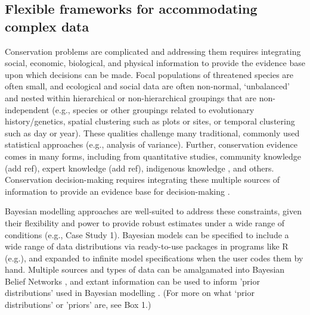 \documentclass{article}
\begin{document}
\subsection*{Flexible frameworks for accommodating complex data}
\par Conservation problems are complicated and addressing them requires integrating social, economic, biological, and physical information to provide the evidence base upon which decisions can be made. Focal populations of threatened species are often small, and ecological and social data are often non-normal, `unbalanced' and nested within hierarchical or non-hierarchical groupings that are non-independent (e.g., species or other groupings related to evolutionary history/genetics, spatial clustering such as plots or sites, or temporal clustering such as day or year). These qualities challenge many traditional, commonly used statistical approaches (e.g., analysis of variance). Further, conservation evidence comes in many forms, including from quantitative studies, community knowledge (add ref), expert knowledge (add ref), indigenous knowledge \citep[e.g.,][]{gryba2023indigenous}, and others. Conservation decision-making requires integrating these multiple sources of information to provide an evidence base for decision-making \citep{stern2022interweaving}. 
\par Bayesian modelling approaches are well-suited to address these constraints, given their flexibility and power to provide robust estimates under a wide range of conditions (e.g., Case Study 1). Bayesian models can be specified to include a wide range of data distributions via ready-to-use packages in programs like R (e.g.), and expanded to infinite  model specifications when the user codes them by hand. Multiple sources and types of data can be amalgamated into Bayesian Belief Networks \citep{marcot2001using,newton2007bayesian}, and extant information can be used to inform 'prior distributions' used in Bayesian modelling \citep{o2008informed,mcneish2016using}. (For more on what `prior distributions' or 'priors' are, see Box 1.)
\end{document}
